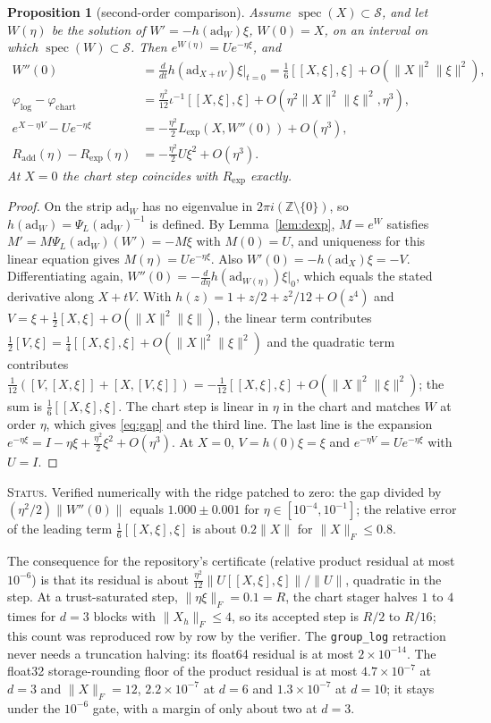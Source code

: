\documentclass[11pt]{article}
\newtheorem{proposition}[theorem]{Proposition}
\theoremstyle{definition}
\theoremstyle{remark}
\newcommand{\ad}{\mathrm{ad}}
\newcommand{\spec}{\operatorname{spec}}
\newcommand{\status}[1]{\par\smallskip\noindent\textsc{Status.} #1\par\smallskip}
\begin{document}
\begin{proposition}[second-order comparison]\label{prop:second}
Assume $\spec(X)\subset\mathcal{S}$, and let $W(\eta)$ be the solution of $W'=-h(\ad_W)\xi$, $W(0)=X$, on an interval on which $\spec(W)\subset\mathcal{S}$. Then $e^{W(\eta)}=Ue^{-\eta\xi}$, and
\begin{align}
W''(0)&=\frac{d}{dt}h(\ad_{X+tV})\xi\Big|_{t=0}=\tfrac16[[X,\xi],\xi]+O(\|X\|^2\|\xi\|^2),\label{eq:W2}\\
\varphi_{\log}-\varphi_{\mathrm{chart}}&=\tfrac{\eta^2}{12}\iota^{-1}[[X,\xi],\xi]+O(\eta^2\|X\|^2\|\xi\|^2,\eta^3),\label{eq:gap}\\
e^{X-\eta V}-Ue^{-\eta\xi}&=-\tfrac{\eta^2}{2}L_{\exp}(X,W''(0))+O(\eta^3),\\
R_{\mathrm{add}}(\eta)-R_{\exp}(\eta)&=-\tfrac{\eta^2}{2}U\xi^2+O(\eta^3).
\end{align}
At $X=0$ the chart step coincides with $R_{\exp}$ exactly.
\end{proposition}
\begin{proof}
On the strip $\ad_W$ has no eigenvalue in $2\pi i(\mathbb{Z}\setminus\{0\})$, so $h(\ad_W)=\Psi_L(\ad_W)^{-1}$ is defined. By Lemma~\ref{lem:dexp}, $M=e^{W}$ satisfies $M'=M\Psi_L(\ad_W)(W')=-M\xi$ with $M(0)=U$, and uniqueness for this linear equation gives $M(\eta)=Ue^{-\eta\xi}$. Also $W'(0)=-h(\ad_X)\xi=-V$. Differentiating again, $W''(0)=-\frac{d}{d\eta}h(\ad_{W(\eta)})\xi|_0$, which equals the stated derivative along $X+tV$. With $h(z)=1+z/2+z^2/12+O(z^4)$ and $V=\xi+\frac12[X,\xi]+O(\|X\|^2\|\xi\|)$, the linear term contributes $\frac12[V,\xi]=\frac14[[X,\xi],\xi]+O(\|X\|^2\|\xi\|^2)$ and the quadratic term contributes $\frac1{12}([V,[X,\xi]]+[X,[V,\xi]])=-\frac1{12}[[X,\xi],\xi]+O(\|X\|^2\|\xi\|^2)$; the sum is $\frac16[[X,\xi],\xi]$. The chart step is linear in $\eta$ in the chart and matches $W$ at order $\eta$, which gives \eqref{eq:gap} and the third line. The last line is the expansion $e^{-\eta\xi}=I-\eta\xi+\frac{\eta^2}{2}\xi^2+O(\eta^3)$. At $X=0$, $V=h(0)\xi=\xi$ and $e^{-\eta V}=Ue^{-\eta\xi}$ with $U=I$.
\end{proof}
\status{Verified numerically with the ridge patched to zero: the gap divided by $(\eta^2/2)\|W''(0)\|$ equals $1.000\pm0.001$ for $\eta\in[10^{-4},10^{-1}]$; the relative error of the leading term $\frac16[[X,\xi],\xi]$ is about $0.2\|X\|$ for $\|X\|_F\le0.8$.}

The consequence for the repository's certificate (relative product residual at most $10^{-6}$) is that its residual is about $\frac{\eta^2}{12}\|U[[X,\xi],\xi]\|/\|U\|$, quadratic in the step. At a trust-saturated step, $\|\eta\xi\|_F=0.1=R$, the chart stager halves $1$ to $4$ times for $d=3$ blocks with $\|X_h\|_F\le4$, so its accepted step is $R/2$ to $R/16$; this count was reproduced row by row by the verifier. The \texttt{group\_log} retraction never needs a truncation halving: its float64 residual is at most $2\times10^{-14}$. The float32 storage-rounding floor of the product residual is at most $4.7\times10^{-7}$ at $d=3$ and $\|X\|_F=12$, $2.2\times10^{-7}$ at $d=6$ and $1.3\times10^{-7}$ at $d=10$; it stays under the $10^{-6}$ gate, with a margin of only about two at $d=3$.
\end{document}
